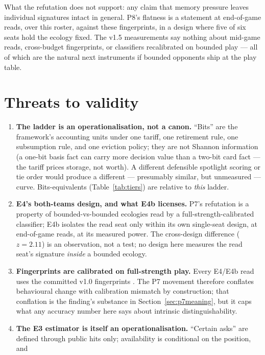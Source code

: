\documentclass[11pt]{article}
\begin{document}
What the refutation does not support: any claim that memory pressure leaves individual
signatures intact in general. P8's flatness is a statement at end-of-game reads, over
this roster, against these fingerprints, in a design where five of six seats hold the
ecology fixed. The v1.5 measurements say nothing about mid-game reads, cross-budget
fingerprints, or classifiers recalibrated on bounded play --- all of which are the
natural next instruments if bounded opponents ship at the play table.

\section{Threats to validity}
\label{sec:threats}

\begin{enumerate}
\item \textbf{The ladder is an operationalisation, not a canon.} ``Bits'' are the
  framework's accounting units under one tariff, one retirement rule, one subsumption
  rule, and one eviction policy; they are not Shannon information (a one-bit basis fact
  can carry more decision value than a two-bit card fact --- the tariff prices storage,
  not worth). A different defensible spotlight scoring or tie order would produce a
  different --- presumably similar, but unmeasured --- curve. Bits-equivalents
  (Table~\ref{tab:tiers}) are relative to \emph{this} ladder.
\item \textbf{E4's both-teams design, and what E4b licenses.} P7's refutation is a
  property of bounded-vs-bounded ecologies read by a full-strength-calibrated
  classifier; E4b isolates the read seat only within its own single-seat design, at
  end-of-game reads, at its measured power. The cross-design difference ($z = 2.11$)
  is an observation, not a test; no design here measures the read seat's signature
  \emph{inside} a bounded ecology.
\item \textbf{Fingerprints are calibrated on full-strength play.} Every E4/E4b read
  uses the committed v1.0 fingerprints \cite{fingerprints}. The P7 movement therefore
  conflates behavioural change with calibration mismatch by construction; that
  conflation is the finding's substance in Section~\ref{sec:p7meaning}, but it caps
  what any accuracy number here says about intrinsic distinguishability.
\item \textbf{The E3 estimator is itself an operationalisation.} ``Certain asks'' are
  defined through public hits only; availability is conditional on the position, and

\end{enumerate}
\end{document}
